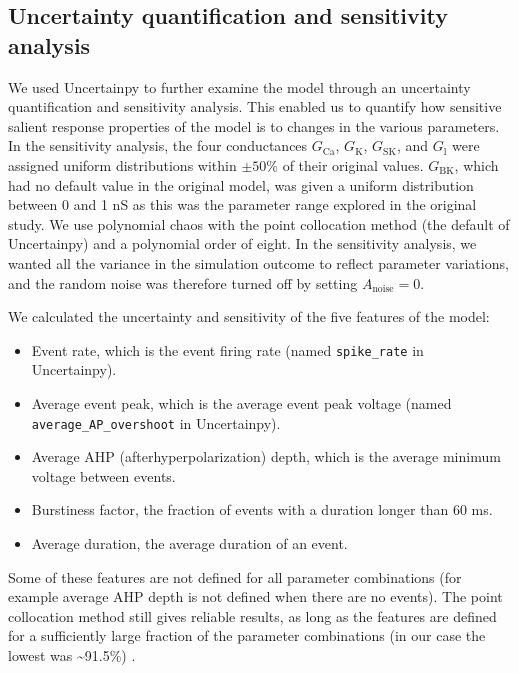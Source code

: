 \documentclass[10pt,a4paper,onecolumn]{article}
\newcommand{\tightlist}{%
  \setlength{\itemsep}{1pt}\setlength{\parskip}{0pt}\setlength{\parsep}{0pt}}
\begin{document}
\subsection{Uncertainty quantification and sensitivity
analysis}\label{uncertainty-quantification-and-sensitivity-analysis}

We used Uncertainpy to further examine the model through an uncertainty
quantification and sensitivity analysis. This enabled us to quantify how
sensitive salient response properties of the model is to changes in the
various parameters. In the sensitivity analysis, the four conductances
\(G_{\mathrm{Ca}}\), \(G_{\mathrm{K}}\), \(G_{\mathrm{SK}}\), and
\(G_{\mathrm{l}}\) were assigned uniform distributions within
\(\pm 50\%\) of their original values. \(G_{\mathrm{BK}}\), which had no
default value in the original model, was given a uniform distribution
between 0 and 1 nS as this was the parameter range explored in the
original study. We use polynomial chaos with the point collocation
method (the default of Uncertainpy) and a polynomial order of eight. In
the sensitivity analysis, we wanted all the variance in the simulation
outcome to reflect parameter variations, and the random noise was
therefore turned off by setting \(A_{\mathrm{noise}} = 0\).

We calculated the uncertainty and sensitivity of the five features of
the model:

\begin{itemize}
\tightlist
\item
  Event rate, which is the event firing rate (named \texttt{spike\_rate}
  in Uncertainpy).
\item
  Average event peak, which is the average event peak voltage (named
  \newline  \texttt{average\_AP\_overshoot} in Uncertainpy).
\item
  Average AHP (afterhyperpolarization) depth, which is the average
  minimum voltage between events.
\item
  Burstiness factor, the fraction of events with a duration longer than
  60 ms.
\item
  Average duration, the average duration of an event.
\end{itemize}

Some of these features are not defined for all parameter combinations
(for example average AHP depth is not defined when there are no events).
The point collocation method still gives reliable results, as long as
the features are defined for a sufficiently large fraction of the
parameter combinations (in our case the lowest was
\textasciitilde{}91.5\%) \autocite{eck2016}.
\end{document}
